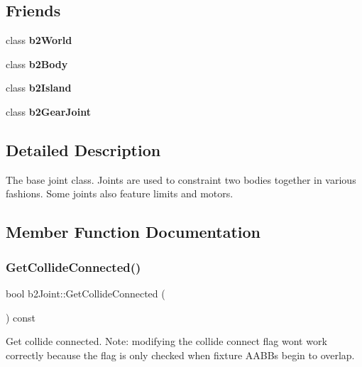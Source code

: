 \subsection*{Friends}
\begin{DoxyCompactItemize}
\item 
\mbox{\label{classb2Joint_ac7f385a7c800a297a8a6e9be3512e3ab}} 
class {\bfseries b2\+World}
\item 
\mbox{\label{classb2Joint_acd34621309c1bdec7335f7545253d704}} 
class {\bfseries b2\+Body}
\item 
\mbox{\label{classb2Joint_a94868ed98b7053fbf0d83680ad6adcb5}} 
class {\bfseries b2\+Island}
\item 
\mbox{\label{classb2Joint_ad10f779c9d5766655fce7233bbc4a554}} 
class {\bfseries b2\+Gear\+Joint}
\end{DoxyCompactItemize}


\subsection{Detailed Description}
The base joint class. Joints are used to constraint two bodies together in various fashions. Some joints also feature limits and motors. 

\subsection{Member Function Documentation}
\mbox{\label{classb2Joint_a48492903df96c8a7b8cad8ed826f8cb0}} 
\subsubsection{\texorpdfstring{Get\+Collide\+Connected()}{GetCollideConnected()}\hspace{0.1cm}{\footnotesize\ttfamily [1/2]}}
{\footnotesize\ttfamily bool b2\+Joint\+::\+Get\+Collide\+Connected (\begin{DoxyParamCaption}{ }\end{DoxyParamCaption}) const}

Get collide connected. Note\+: modifying the collide connect flag won\textquotesingle{}t work correctly because the flag is only checked when fixture A\+A\+B\+Bs begin to overlap. \mbox{\label{classb2Joint_a48492903df96c8a7b8cad8ed826f8cb0}} 
